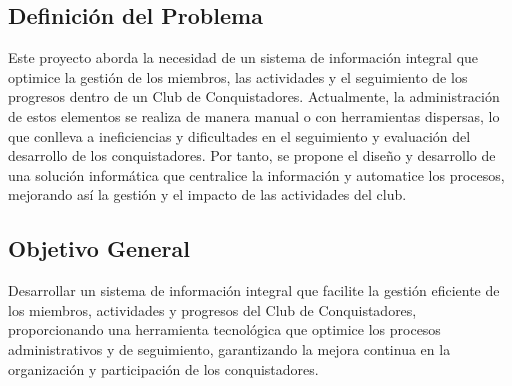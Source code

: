 \documentclass[stu, 12pt, letterpaper, donotrepeattitle, floatsintext, natbib]{apa7}
\begin{document}
\subsection{Definici\'on del Problema}
Este proyecto aborda la necesidad de un sistema de informaci\'on integral que
optimice la gesti\'on de los miembros, las actividades y el seguimiento de los
progresos dentro de un Club de Conquistadores. Actualmente, la administraci\'on
de estos elementos se realiza de manera manual o con herramientas dispersas, lo
que conlleva a ineficiencias y dificultades en el seguimiento y evaluaci\'on
del desarrollo de los conquistadores. Por tanto, se propone el diseño y
desarrollo de una soluci\'on inform\'atica que centralice la informaci\'on y
automatice los procesos, mejorando as\'i la gesti\'on y el impacto de las
actividades del club.

\subsection{Objetivo General}
Desarrollar un sistema de informaci\'on integral que facilite la gesti\'on
eficiente de los miembros, actividades y progresos del Club de Conquistadores,
proporcionando una herramienta tecnol\'ogica que optimice los procesos
administrativos y de seguimiento, garantizando la mejora continua en la
organizaci\'on y participaci\'on de los conquistadores.
\end{document}
